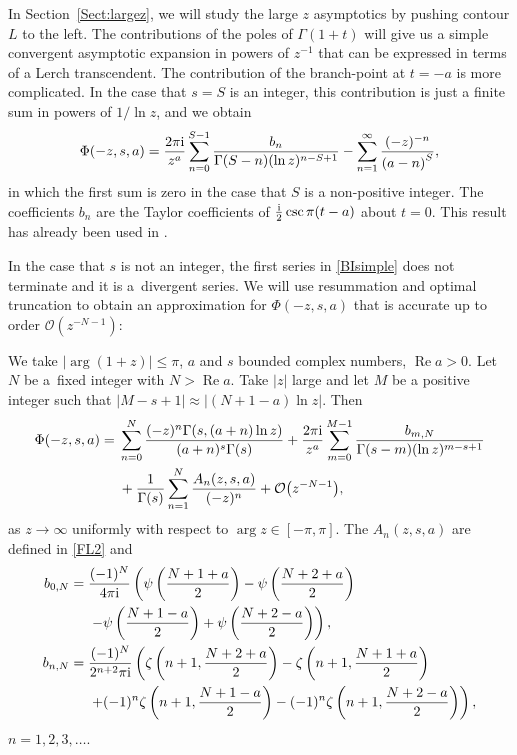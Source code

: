 \documentclass[pdftex]{sigma}
\numberwithin{equation}{section}
\def\iunit{{\rm i}}
\def\bigO{{\mathcal O}}
\begin{document}
In Section~\ref{Sect:largez}, we will study the large $z$ asymptotics by pushing contour $L$ to the left.
The contributions of the poles of $\Gamma(1+t)$ will give us a simple convergent asymptotic
expansion in powers of $z^{-1}$ that can be expressed in terms of a Lerch transcendent.
The contribution of the branch-point at $t=-a$ is more complicated. In the case that $s=S$ is an integer,
this contribution is just a finite sum in powers of $1/\ln z$, and we obtain
\begin{gather}\label{BIsimple}
 \Phi(-z,s,a)=\frac{2\pi\iunit}{z^{a}}\sum_{n=0}^{S-1}
 \frac{b_n}{\Gamma(S-n)(\ln z)^{n-S+1}}
 -\sum_{n=1}^\infty\frac{(-z)^{-n}}{\left(a-n\right)^S},
\end{gather}
in which the first sum is zero in the case that $S$ is a non-positive integer. The coefficients
$b_n$ are the Taylor coefficients of $\frac{\iunit}2 \csc \pi(t-a)$ about $t=0$.
This result has already been used in \cite[Lemma 3]{NCA2023}.

In the case that $s$ is not an integer, the first series in \eqref{BIsimple} does not terminate
and it is a~divergent series. We will use resummation and optimal truncation to obtain
an approximation for $\Phi(-z,s,a)$ that is accurate up to order
$\bigO\left(z^{-{N-1}}\right)$:

\begin{theorem}\label{thm1}
 We take $|\arg(1+z)|\leq \pi$, $a$ and $s$ bounded complex numbers,
 $\operatorname{Re} a>0$. Let~$N$ be a~fixed integer with $N>\operatorname{Re} a$. Take $|z|$ large and let $M$
 be a positive integer such that $|M-s+1|\approx |(N+1-a)\ln z|$. Then
 \begin{align*}%
 \Phi(-z,s,a)={}& \sum_{n=0}^N \frac{(-z)^n \Gamma(s,(a+n)\ln z)}{(a+n)^s\Gamma(s)}
 +\frac{2\pi\iunit}{z^{a}}\sum_{m=0}^{M-1}
 \frac{b_{m,N}}{\Gamma(s-m)(\ln z)^{m-s+1}}\\
 & +\frac1{\Gamma(s)}\sum_{n=1}^N \frac{A_n(z,s,a)}{%
 (-z)^n}+\bigO\bigl(z^{-N-1}\bigr),
\end{align*}
as $z\to\infty$ uniformly with respect to $\arg z\in[-\pi,\pi]$.
The $A_n(z,s,a)$ are defined in \eqref{FL2} and
\begin{align}
 b_{0,N}={}&\frac{(-1)^N}{4\pi\iunit}\left(\psi\left(\frac{N+1+a}2\right)
 -\psi\left(\frac{N+2+a}2\right)\right.\nonumber\\
 &\left.-\psi\left(\frac{N+1-a}2\right)
 +\psi\left(\frac{N+2-a}2\right)\right),\nonumber\\
 b_{n,N}={}&\frac{(-1)^{N}}{2^{n+2}\pi\iunit}\left(\zeta\left(n+1,\frac{N+2+a}2\right)
 -\zeta\left(n+1,\frac{N+1+a}2\right)\right.\nonumber\\
 &\left.+(-1)^n\zeta\left(n+1,\frac{N+1-a}2\right)
 -(-1)^n\zeta\left(n+1,\frac{N+2-a}2\right)\right),\label{BnN2}
\end{align}
$n=1,2,3,\ldots$.
\end{theorem}
\end{document}
